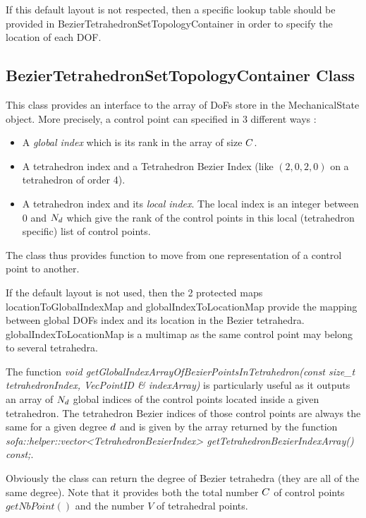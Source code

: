 \documentclass[a4paper,11pt]{article}
\begin{document}
If this default layout is not respected, then a specific lookup table should be provided in
BezierTetrahedronSetTopologyContainer in order to specify the location of each DOF.

\subsection{BezierTetrahedronSetTopologyContainer Class}

This class provides an interface to the array of DoFs store in the MechanicalState object. More precisely, a control point can specified in 3 different ways :

\begin{itemize}
	\item A {\em global index} which is its rank in the array of size ${C}$.
	\item A tetrahedron index and a Tetrahedron Bezier Index (like $(2,0,2,0)$ on a tetrahedron of order 4).
	\item A tetrahedron index and its {\em local index}. The local index is an integer between 0 and $N_{d}$ which give the rank of the control points in this local (tetrahedron specific) list of control points.
\end{itemize}

The class thus provides function to move from one representation of a control point to another.

If the default layout is not used, then the 2 protected maps locationToGlobalIndexMap and
globalIndexToLocationMap provide the mapping between global DOFs index and its location in
the Bezier tetrahedra. globalIndexToLocationMap is a multimap as the same control point
may belong to several tetrahedra.


The function {\it void getGlobalIndexArrayOfBezierPointsInTetrahedron(const size\_t tetrahedronIndex, VecPointID \& indexArray) } is particularly useful as it outputs an array of $N_{d}$ global indices of the control points located inside a given tetrahedron. The tetrahedron Bezier indices of those control points are always the same for a given degree ${d}$ and is given by the array returned by the function {\it sofa::helper::vector<TetrahedronBezierIndex> getTetrahedronBezierIndexArray() const;}.

Obviously the class can return the degree of  Bezier tetrahedra (they are all of the same degree). Note that it provides both the total number ${C}$ of control points $getNbPoint()$ and the number $V$ of tetrahedral points.
\end{document}
